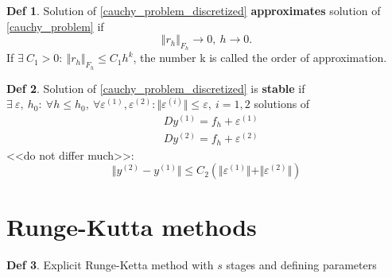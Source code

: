 \documentclass[a4paper,11pt]{article} %
\theoremstyle{plain} %
\theoremstyle{definition} %
\newtheorem{defin}{Def}[section]
\theoremstyle{remark} %
\begin{document}
\begin{defin}
	Solution of \eqref{cauchy_problem_discretized} \textbf{approximates} solution of \eqref{cauchy_problem} if 
	\begin{equation}
		\Vert r_h \Vert_{F_h} \rightarrow 0,\ h \rightarrow 0.
	\end{equation}
	 If $\exists\ C_1 > 0:\ \Vert r_h \Vert_{F_h} \le C_1 h^k$, the number k is called the order of approximation.
\end{defin}

\begin{defin}
	Solution of \eqref{cauchy_problem_discretized} is \textbf{stable} if $\exists\ \varepsilon,\ h_0:\ \forall h \le h_0,\ \forall \varepsilon^{(1)}, \varepsilon^{(2)}: \Vert \varepsilon^{(i)} \Vert \le \varepsilon,\ i = 1,2$ solutions of 
	\begin{equation}
		\begin{aligned}
		& D y^{(1)} = f_h + \varepsilon^{(1)} \\
		& D y^{(2)} = f_h + \varepsilon^{(2)}
		\end{aligned}
	\end{equation}
	<<do not differ much>>:
	\begin{equation}
		\Vert y^{(2)} - y^{(1)} \Vert \le C_2 (\Vert \varepsilon^{(1)}\Vert + \Vert \varepsilon^{(2)}\Vert)
	\end{equation}
\end{defin}

\section{Runge-Kutta methods}

\begin{defin}
	Explicit Runge-Ketta method with $s$ stages and defining parameters
\end{defin}
\end{document}
